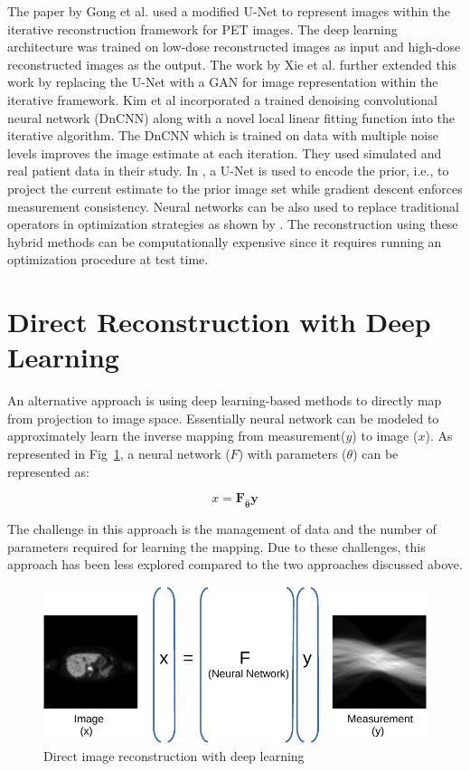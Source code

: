 The paper by Gong et al. used a modified U-Net to represent images within the iterative reconstruction framework for \ac{PET} images. The deep learning architecture was trained on low-dose reconstructed images as input and high-dose reconstructed images as the output. The work by Xie et al. further extended this work by replacing the U-Net with a \ac{GAN} for image representation within the iterative framework. Kim et al incorporated a trained denoising convolutional neural network (DnCNN) along with a novel local linear fitting function into the iterative algorithm. The DnCNN which is trained on data with multiple noise levels improves the image estimate at each iteration. They used simulated and real patient data in their study. In \cite{gupta2018cnn}, a U-Net is used to encode the prior, i.e., to project the current estimate to the prior image set while gradient descent enforces measurement consistency. Neural networks can be also used to replace traditional operators in optimization strategies as shown by \cite{adler2018learned}. The reconstruction using these hybrid methods can be computationally expensive since it requires running an optimization procedure at test time.

\section{Direct Reconstruction with Deep Learning}

An alternative approach is using deep learning-based methods to directly map from projection to image space. Essentially neural network can be modeled to approximately learn  the inverse mapping from measurement($y$) to image ($x$). As represented in Fig~\ref{fig:direct}, a neural network ($F$) with parameters ($\theta$) can be represented as:

\begin{equation}\label{eq:direct}
x=\boldsymbol{F}_{\widehat{\boldsymbol{\theta}}} \boldsymbol{y}
\end{equation}

The challenge in this approach is the management of data and the number of parameters required for learning the mapping. Due to these challenges, this approach has been less explored compared to the two approaches discussed above. 


\begin{figure}[!htbp]
	\centering
	\includegraphics[width=0.8\linewidth]{./Figures/direct-crop.pdf}
	\caption{Direct image reconstruction with deep learning}
	\label{fig:direct}
\end{figure}


